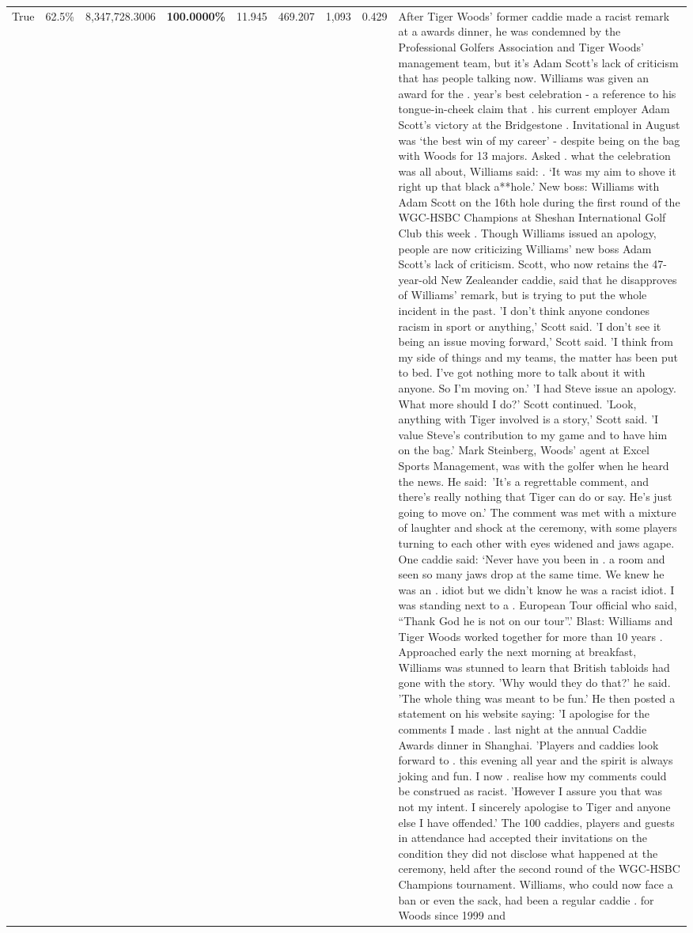\begin{table}[H]
\begin{tabular}{lllrlllll}
True & 62.5\% & 8,347,728.3006 & \bfseries \color{red} 100.0000\% & 11.945 & 469.207 & 1,093 & 0.429 & After Tiger Woods' former caddie made a racist remark at a awards dinner, he was condemned by the Professional Golfers Association and Tiger Woods' management team, but it's Adam Scott's lack of criticism that has people talking now. Williams was given an award for the . year’s best celebration - a reference to his tongue-in-cheek claim that . his current employer Adam Scott’s victory at the Bridgestone . Invitational in August was ‘the best win of my career’ - despite being on the bag with Woods for 13 majors. Asked . what the celebration was all about, Williams said: . ‘It was my aim to shove it right up that black a**hole.’ New boss: Williams with Adam Scott  on the 16th hole during the first round of the WGC-HSBC Champions at Sheshan International Golf Club this week . Though Williams issued an apology, people are now criticizing Williams' new boss Adam Scott's lack of criticism. Scott, who now retains the 47-year-old New Zealeander caddie, said that he disapproves of Williams' remark, but is trying to put the whole incident in the past. 'I don't think anyone condones racism in sport or anything,' Scott said. 'I don't see it being an issue moving forward,' Scott said. 'I think from my side of things and my teams, the matter has been put to bed. I've got nothing more to talk about it with anyone. So I'm moving on.' 'I had Steve issue an apology. What more should I do?' Scott continued. 'Look, anything with Tiger involved is a story,' Scott said. 'I value Steve's contribution to my game and to have him on the bag.' Mark Steinberg, Woods' agent at Excel Sports Management, was with the golfer when he heard the news. He said: 'It's a regrettable comment, and there's really nothing that Tiger can do or say. He's just going to move on.' The comment was met with a mixture of laughter and shock at the ceremony, with some players turning to each other with eyes widened and jaws agape. One caddie said: ‘Never have you been in . a room and seen so many jaws drop at the same time. We knew he was an . idiot but we didn’t know he was a racist idiot. I was standing next to a . European Tour official who said, “Thank God he is not on our tour”.’ Blast: Williams and Tiger Woods worked together for more than 10 years . Approached early the next morning at breakfast, Williams was stunned to learn that British tabloids had gone with the story. 'Why would they do that?' he said. 'The whole thing was meant to be fun.' He then posted a statement on his website saying: 'I apologise for the comments I made . last night at the annual Caddie Awards dinner in Shanghai. 'Players and caddies look forward to . this evening all year and the spirit is always joking and fun. I now . realise how my comments could be construed as racist. 'However I assure you that was not my intent. I sincerely apologise to Tiger and anyone else I have offended.' The 100 caddies, players and guests in attendance had accepted their invitations on the condition they did not disclose what happened at the ceremony, held after the second round of the WGC-HSBC Champions tournament. Williams, who could now face a ban or even the sack, had been a regular caddie . for Woods since 1999 and 
\end{tabular}
\end{table}
